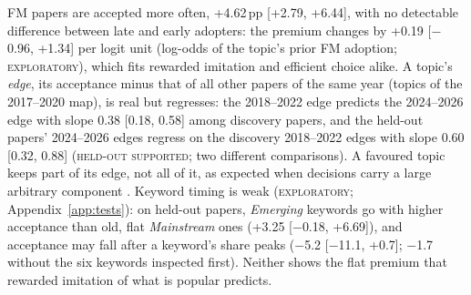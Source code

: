 \documentclass[11pt]{article}
\newcommand{\lab}[1]{\textsc{#1}}
\begin{document}
FM papers are accepted more often, +4.62\,pp [+2.79, +6.44], with no detectable difference between late and
early adopters: the premium changes by +0.19 [$-$0.96, +1.34] per logit unit (log-odds of the topic's prior FM
adoption; \lab{exploratory}), which fits rewarded imitation and efficient choice alike. A topic's \emph{edge}, its acceptance
minus that of all other papers of the same year (topics of the 2017--2020 map), is real but regresses: the 2018--2022 edge predicts the 2024--2026
edge with slope 0.38 [0.18, 0.58] among discovery papers, and the held-out papers' 2024--2026 edges regress on the
discovery 2018--2022 edges with slope 0.60 [0.32, 0.88] (\lab{held-out supported}; two different comparisons). A
favoured topic keeps part of its edge, not all of it, as expected when decisions carry a large arbitrary component
\citep{cortes2021inconsistency,beygelzimer2023has}. Keyword timing is weak (\lab{exploratory}; Appendix~\ref{app:tests}):
on held-out papers, \emph{Emerging} keywords go with higher acceptance than old, flat \emph{Mainstream} ones (+3.25
[$-$0.18, +6.69]), and acceptance may fall after a keyword's share peaks ($-$5.2 [$-$11.1, +0.7]; $-$1.7 without the
six keywords inspected first). Neither shows the flat premium that rewarded imitation of what is
popular predicts.
\end{document}
